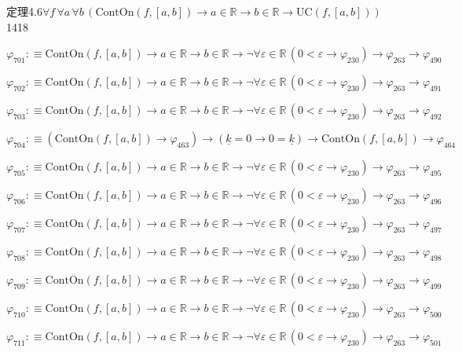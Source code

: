 \begin{fullproof}{定理4.6}{$\forall f\,\forall a\,\forall b\,(\mathrm{ContOn}(f,[a,b]) \to a \in \mathbb{R} \to b \in \mathbb{R} \to \mathrm{UC}(f,[a,b]))$}{1418}
\begin{abbrevlist}
\item $\varphi_{701} :\equiv \mathrm{ContOn}(f,[a,b]) \to a \in \mathbb{R} \to b \in \mathbb{R} \to \neg \forall \varepsilon \in \mathbb{R}\,(0 < \varepsilon \to \varphi_{230}) \to \varphi_{263} \to \varphi_{490}$
\item $\varphi_{702} :\equiv \mathrm{ContOn}(f,[a,b]) \to a \in \mathbb{R} \to b \in \mathbb{R} \to \neg \forall \varepsilon \in \mathbb{R}\,(0 < \varepsilon \to \varphi_{230}) \to \varphi_{263} \to \varphi_{491}$
\item $\varphi_{703} :\equiv \mathrm{ContOn}(f,[a,b]) \to a \in \mathbb{R} \to b \in \mathbb{R} \to \neg \forall \varepsilon \in \mathbb{R}\,(0 < \varepsilon \to \varphi_{230}) \to \varphi_{263} \to \varphi_{492}$
\item $\varphi_{704} :\equiv (\mathrm{ContOn}(f,[a,b]) \to \varphi_{463}) \to (\underline{k} = 0 \to 0 = \underline{k}) \to \mathrm{ContOn}(f,[a,b]) \to \varphi_{464}$
\item $\varphi_{705} :\equiv \mathrm{ContOn}(f,[a,b]) \to a \in \mathbb{R} \to b \in \mathbb{R} \to \neg \forall \varepsilon \in \mathbb{R}\,(0 < \varepsilon \to \varphi_{230}) \to \varphi_{263} \to \varphi_{495}$
\item $\varphi_{706} :\equiv \mathrm{ContOn}(f,[a,b]) \to a \in \mathbb{R} \to b \in \mathbb{R} \to \neg \forall \varepsilon \in \mathbb{R}\,(0 < \varepsilon \to \varphi_{230}) \to \varphi_{263} \to \varphi_{496}$
\item $\varphi_{707} :\equiv \mathrm{ContOn}(f,[a,b]) \to a \in \mathbb{R} \to b \in \mathbb{R} \to \neg \forall \varepsilon \in \mathbb{R}\,(0 < \varepsilon \to \varphi_{230}) \to \varphi_{263} \to \varphi_{497}$
\item $\varphi_{708} :\equiv \mathrm{ContOn}(f,[a,b]) \to a \in \mathbb{R} \to b \in \mathbb{R} \to \neg \forall \varepsilon \in \mathbb{R}\,(0 < \varepsilon \to \varphi_{230}) \to \varphi_{263} \to \varphi_{498}$
\item $\varphi_{709} :\equiv \mathrm{ContOn}(f,[a,b]) \to a \in \mathbb{R} \to b \in \mathbb{R} \to \neg \forall \varepsilon \in \mathbb{R}\,(0 < \varepsilon \to \varphi_{230}) \to \varphi_{263} \to \varphi_{499}$
\item $\varphi_{710} :\equiv \mathrm{ContOn}(f,[a,b]) \to a \in \mathbb{R} \to b \in \mathbb{R} \to \neg \forall \varepsilon \in \mathbb{R}\,(0 < \varepsilon \to \varphi_{230}) \to \varphi_{263} \to \varphi_{500}$
\item $\varphi_{711} :\equiv \mathrm{ContOn}(f,[a,b]) \to a \in \mathbb{R} \to b \in \mathbb{R} \to \neg \forall \varepsilon \in \mathbb{R}\,(0 < \varepsilon \to \varphi_{230}) \to \varphi_{263} \to \varphi_{501}$

\end{abbrevlist}
\end{fullproof}
